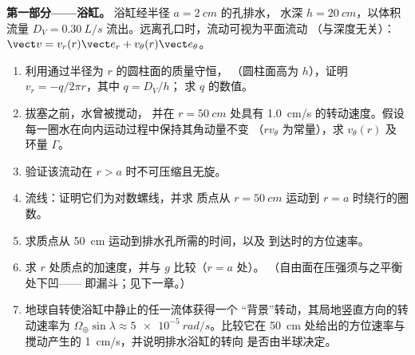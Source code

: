 \begin{problem}
\label{pb:b2:fluid-kinematics:1}

\medskip
\noindent\textbf{第一部分——浴缸。}
浴缸经半径 $a = \qty{2}{cm}$ 的孔排水，
水深 $h = \qty{20}{cm}$，以体积流量 $D_V =
\qty{0.30}{L/s}$ 流出。远离孔口时，流动可视为平面流动
（与深度无关）：$\vect v = v_r(r)\vect e_r + v_\theta(r)\vect e_\theta$。
\begin{enumerate}
  \item 利用通过半径为 $r$ 的圆柱面的质量守恒，
        （圆柱面高为 $h$），证明 $v_r = -q/2\pi r$，其中 $q = D_V/h$；
        求 $q$ 的数值。
  \item 拔塞之前，水曾被搅动，
        并在 $r = \qty{50}{cm}$ 处具有 \qty{1.0}{cm/s} 的转动速度。假设
        每一圈水在向内运动过程中保持其角动量不变
        （$rv_\theta$ 为常量），求 $v_\theta(r)$ 及
        环量 $\Gamma$。
  \item 验证该流动在
        $r > a$ 时不可压缩且无旋。
  \item 流线：证明它们为对数螺线，并求
        质点从 $r = \qty{50}{cm}$ 运动到
        $r = a$ 时绕行的圈数。
  \item 求质点从 \qty{50}{cm} 运动到排水孔所需的时间，以及
        到达时的方位速率。
  \item 求 $r$ 处质点的加速度，并与 $g$ 比较（$r = a$ 处）。
        （自由面在压强须与之平衡处下凹——
        即漏斗；见下一章。）
  \item 地球自转使浴缸中静止的任一流体获得一个
        “背景”转动，其局地竖直方向的转动速率为
        $\Omega_\oplus\sin\lambda \approx \qty{5e-5}{rad/s}$。比较它在
        \qty{50}{cm} 处给出的方位速率与搅动产生的
        \qty{1}{cm/s}，并说明排水浴缸的转向
        是否由半球决定。
\end{enumerate}


\end{problem}
